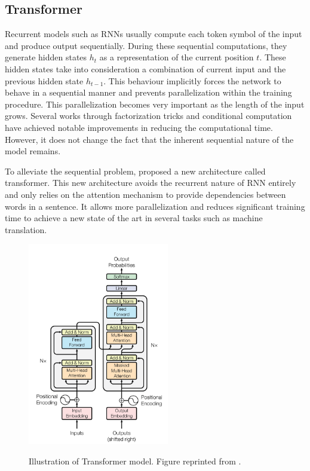 \subsection{Transformer}
Recurrent models such as RNNs usually compute each token symbol of the input and produce output sequentially. During these sequential computations, they generate hidden states $h_t$ as a representation of the current position $t$. These hidden states take into consideration a combination of current input and the previous hidden state $h_{t-1}$. This behaviour implicitly forces the network to behave in a sequential manner and prevents parallelization within the training procedure. This parallelization becomes very important as the length of the input grows. Several works through factorization tricks  and conditional computation  have achieved notable improvements in reducing the computational time. However, it does not change the fact that the inherent sequential nature of the model remains.

To alleviate the sequential problem,  proposed a new architecture called transformer. This new architecture avoids the recurrent nature of RNN entirely and only relies on the attention mechanism to provide dependencies between words in a sentence. It allows more parallelization and reduces significant training time to achieve a new state of the art in several tasks such as machine translation.

\begin{figure}[t]
    {\includegraphics[width=0.55\textwidth]{img/transformer.png}}
    \centering
    \caption{Illustration of Transformer model. Figure reprinted from .}
    \label{img:transformer}
\end{figure}

